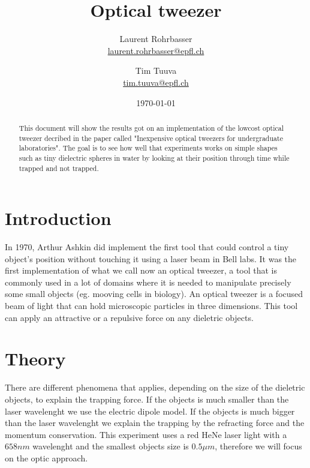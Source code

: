 \documentclass[a4paper,12pt,twoside]{article}	%
\newcommand{\mail}[1]{{\href{mailto:#1}{#1}}}
\begin{document}
\title{Optical tweezer}
\date{\today}
\author{
	Laurent Rohrbasser\\{\small \mail{laurent.rohrbasser@epfl.ch}} \and 
	Tim Tuuva\\{\small \mail{tim.tuuva@epfl.ch}}
	}
\maketitle

\tableofcontents %

\baselineskip=16pt
\parindent=15pt
\parskip=5pt

\begin{abstract}

This document will show the results got on an implementation of the lowcost optical tweezer decribed in the paper called "Inexpensive optical tweezers for undergraduate laboratories". The goal is to see how well that experiments works on simple shapes such as tiny dielectric spheres in water by looking at their position through time while trapped and not trapped.

\end{abstract}

\section{Introduction}
In 1970, Arthur Ashkin did implement the first tool that could control a tiny object's position without touching it using a laser beam in Bell labs. It was the first implementation of what we call now an optical tweezer, a tool that is commonly used in a lot of domains where it is needed to manipulate precisely some small objects (eg. mooving cells in biology). An optical tweezer is a focused beam of light that can hold microscopic particles in three dimensions. This tool can apply an attractive or a repulsive force on any dieletric objects. 


\section{Theory}
There are different phenomena that applies, depending on the size of the dieletric objects, to explain the trapping force.
If the objects is much smaller than the laser wavelenght we use the electric dipole model.
If the objects is much bigger than the laser wavelenght we explain the trapping by the refracting force and the momentum conservation.
This experiment uses a red HeNe laser light with a $658 nm$ wavelenght and the smallest objects size is $0.5\mu m$, %
therefore we will focus on the optic approach.
\end{document}

